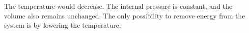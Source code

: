 The temperature would decrease. The internal pressure is constant, and the volume also remains unchanged. The only possibility to remove energy from the system is by lowering the temperature.